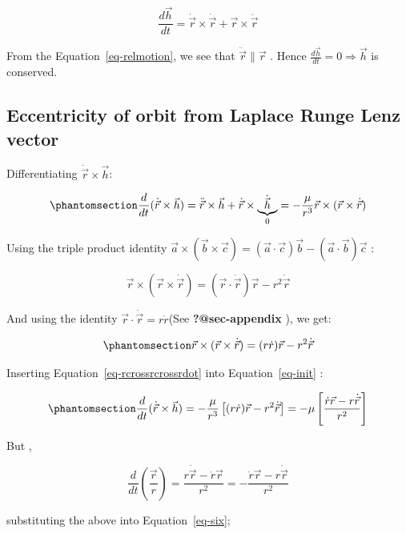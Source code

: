 \documentclass[
  letterpaper,
  DIV=11,
  numbers=noendperiod]{scrreprt}
\begin{document}
\[
\frac{d\vec{h}}{dt}=\dot{\vec{r}}\times\dot{\vec{r}}+ \vec{r}\times \ddot{\vec{r}}
\]

From the Equation~\ref{eq-relmotion}, we see that
\(\ddot{\vec{r}} \parallel \vec{r}\) . Hence
\(\frac{d\vec{h}}{dt}=0 \Rightarrow \vec{h}\) is conserved.

\subsection{Eccentricity of orbit from Laplace Runge Lenz
vector}\label{eccentricity-of-orbit-from-laplace-runge-lenz-vector}

Differentiating \(\dot {\vec r} \times \vec h\):

\begin{equation}\phantomsection\label{eq-init}{
\frac{d}{dt}(\dot{\vec r}\times\vec h)= \ddot{\vec r}\times\vec h + \dot{\vec r}\times\underbrace{\dot{\vec h}}_{0}= -\frac{\mu}{r^{3}}\vec r\times(\vec r\times\dot{\vec r})
}\end{equation}

Using the triple product identity
\(\vec{a}\times(\vec{b}\times\vec{c})=(\vec{a}\cdot\vec{c})\vec b-(\vec a \cdot \vec b)\vec c\)
:

\[
\vec r\times(\vec r\times\dot{\vec r})= (\vec r\cdot\dot{\vec r})\vec r - r^{2}\dot{\vec r}
\]

And using the identity \(\vec r \cdot \dot{\vec r}=r\dot r\)(See
\textbf{?@sec-appendix} ), we get:

\begin{equation}\phantomsection\label{eq-rcrossrcrossrdot}{ 
\vec r\times(\vec r\times\dot{\vec r})= (r\dot r)\vec r - r^{2}\dot{\vec r} 
}\end{equation}

Inserting Equation~\ref{eq-rcrossrcrossrdot} into Equation~\ref{eq-init}
:

\begin{equation}\phantomsection\label{eq-six}{
\frac{d}{dt}(\dot{\vec r}\times \vec h)=- \frac{\mu}{r^3}\left[(r \dot{r})\vec r - r^2 \dot{\vec r}\right]=-\mu \left[\frac{\dot r \vec r-r\dot{\vec r}}{r^2}\right]
}\end{equation}

But ,

\[
\frac{d}{dt}\left(\frac{\vec r}{r}\right)= \frac{r\dot{\vec r}-\dot r\vec r}{r^2}=-\frac{\dot r\vec r-r\dot{\vec r}}{r^2}
\]

substituting the above into Equation~\ref{eq-six};
\end{document}
